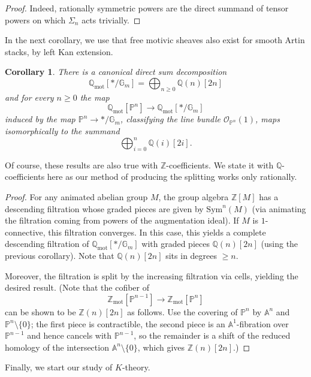 \documentclass[11pt]{amsart}
\numberwithin{equation}{section}
\numberwithin{theorem}{section}
\newtheorem{corollary}[theorem]{Corollary}
\theoremstyle{definition}
\begin{document}
\begin{proof} Indeed, rationally symmetric powers are the direct summand of tensor powers on which $\Sigma_n$ acts trivially.
\end{proof}

In the next corollary, we use that free motivic sheaves also exist for smooth Artin stacks, by left Kan extension.

\begin{corollary} There is a canonical direct sum decomposition
\[
\mathbb Q_{\mathrm{mot}}[\ast/\mathbb G_m] = \bigoplus_{n\geq 0} \mathbb Q(n)[2n]
\]
and for every $n\geq 0$ the map
\[
\mathbb Q_{\mathrm{mot}}[\mathbb P^n]\to \mathbb Q_{\mathrm{mot}}[\ast/\mathbb G_m]
\]
induced by the map $\mathbb P^n\to \ast/\mathbb G_m$, classifying the line bundle $\mathcal O_{\mathbb P^n}(1)$, maps isomorphically to the summand
\[
\bigoplus_{i=0}^n \mathbb Q(i)[2i].
\]
\end{corollary}

Of course, these results are also true with $\mathbb Z$-coefficients. We state it with $\mathbb Q$-coefficients here as our method of producing the splitting works only rationally.

\begin{proof} For any animated abelian group $M$, the group algebra $\mathbb Z[M]$ has a descending filtration whose graded pieces are given by $\mathrm{Sym}^n(M)$ (via animating the filtration coming from powers of the augmentation ideal). If $M$ is $1$-connective, this filtration converges. In this case, this yields a complete descending filtration of $\mathbb Q_{\mathrm{mot}}[\ast/\mathbb G_m]$ with graded pieces $\mathbb Q(n)[2n]$ (using the previous corollary). Note that $\mathbb Q(n)[2n]$ sits in degrees $\geq n$.

Moreover, the filtration is split by the increasing filtration via cells, yielding the desired result. (Note that the cofiber of
\[
\mathbb Z_{\mathrm{mot}}[\mathbb P^{n-1}]\to \mathbb Z_{\mathrm{mot}}[\mathbb P^n]
\]
can be shown to be $\mathbb Z(n)[2n]$ as follows. Use the covering of $\mathbb P^n$ by $\mathbb A^n$ and $\mathbb P^n\setminus \{0\}$; the first piece is contractible, the second piece is an $\mathbb A^1$-fibration over $\mathbb P^{n-1}$ and hence cancels with $\mathbb P^{n-1}$, so the remainder is a shift of the reduced homology of the intersection $\mathbb A^n\setminus \{0\}$, which gives $\mathbb Z(n)[2n]$.)
\end{proof}

Finally, we start our study of $K$-theory.
\end{document}
